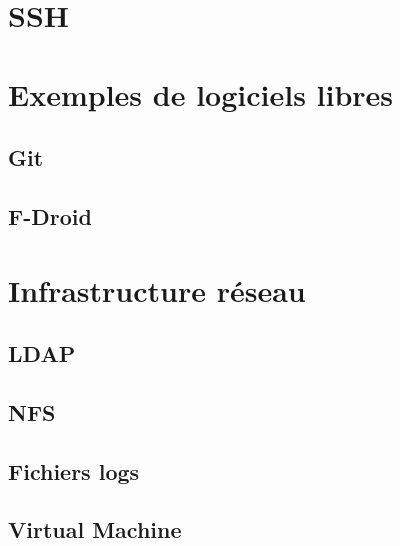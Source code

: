 \documentclass[a4paper, 12pt, titlepage]{article}
\begin{document}
  \section{SSH}
    

\newpage
\section{Exemples de logiciels libres}
	
  \subsection{Git}
    
  \subsection{F-Droid}
    

\newpage
\section{Infrastructure réseau}
  \subsection{LDAP}\label{subsec:ldap}
    
  \subsection{NFS}
    
  \subsection{Fichiers logs}
    
  \subsection{Virtual Machine}
    
\end{document}
